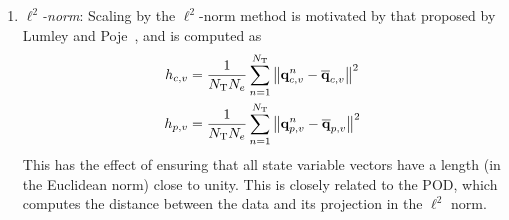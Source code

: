 \begin{enumerate}
	\item $\ell^2$\textit{-norm}: Scaling by the $\ell^2$-norm method is motivated by that proposed by Lumley and Poje~\cite{Lumley1997}, and is computed as
	\begin{align}
		h_{c,v} &= \frac{1}{N_{\text{T}} N_{e}} \sum_{n=1}^{N_{\text{T}}} \left\Vert \mathbf{q}_{c,v}^{n} - \mathbf{\overline{q}}_{c,v} \right\Vert^2 \\
		h_{p,v} &= \frac{1}{N_{\text{T}} N_{e}} \sum_{n=1}^{N_{\text{T}}} \left\Vert \mathbf{q}_{p,v}^{n} - \mathbf{\overline{q}}_{p,v} \right\Vert^2
	\end{align}
	This has the effect of ensuring that all state variable vectors have a length (in the Euclidean norm) close to unity. This is closely related to the POD, which computes the distance between the data and its projection in the $\ell^2$ norm.


\end{enumerate}
